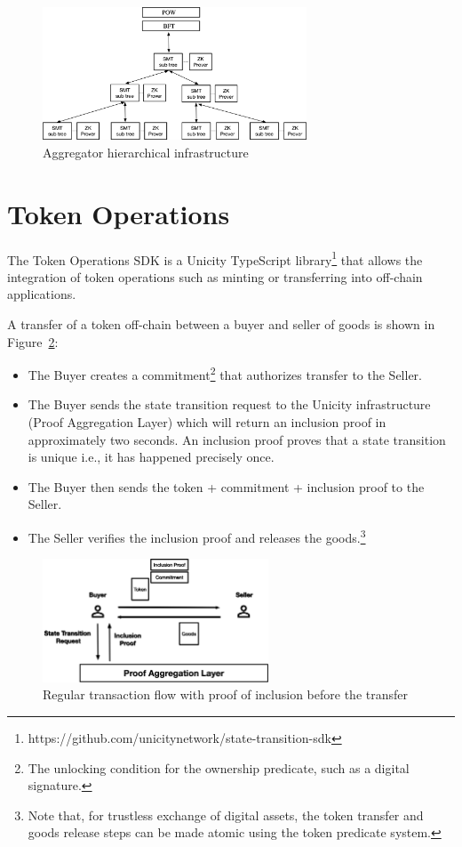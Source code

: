 \documentclass{article}
\begin{document}
\begin{figure}[htbp]
    \centering
    \vspace{\baselineskip}
    \includegraphics[width=0.7\textwidth]{SMT-ProverMarketPlace.png}
    \caption{Aggregator hierarchical infrastructure}
    \label{fig:SMT-Infra}
\end{figure}

\section{Token Operations}

The Token Operations SDK is a Unicity TypeScript library\footnote{https://github.com/unicitynetwork/state-transition-sdk} that allows the integration of token operations such as minting or transferring into off-chain applications.

A transfer of a token off-chain between a buyer and seller of goods is shown in Figure~\ref{fig:LowLatency1}:

\begin{itemize}
  \item The Buyer creates a commitment\footnote{The unlocking condition for the ownership predicate, such as a digital signature.} that authorizes transfer to the Seller.
  \item The Buyer sends the state transition request to the Unicity infrastructure (Proof Aggregation Layer) which will return an inclusion proof in approximately two seconds. An inclusion proof proves that a state transition is unique i.e., it has happened precisely once.
  \item The Buyer then sends the token + commitment + inclusion proof to the Seller.
  \item The Seller verifies the inclusion proof and releases the goods.\footnote{Note that, for trustless exchange of digital assets, the token transfer and goods release steps can be made atomic using the token predicate system.}
\end{itemize}

\begin{figure}[ht]
    \centering
    \includegraphics[width=0.6\textwidth]{Transaction1.png}
    \caption{Regular transaction flow with proof of inclusion before the transfer}
    \label{fig:LowLatency1}
\end{figure}
\end{document}
